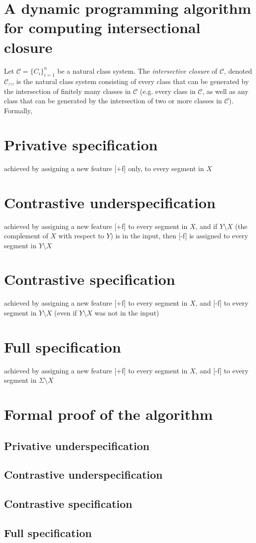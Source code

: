 \documentclass[11pt, oneside]{article}   	%
\begin{document}
\section{A dynamic programming algorithm for computing intersectional closure}

Let $\mathcal C = \{C_i\}_{i=1}^n$ be a natural class system. The \textit{intersective closure} of $\mathcal C$, denoted $\mathcal C_\cap$, is the natural class system consisting of every class that can be generated by the intersection of finitely many classes in $\mathcal C$ (e.g. every class in $\mathcal C$, as well as any class that can be generated by the intersection of two or more classes in $\mathcal C$). Formally, 

\section{Privative specification}
achieved by assigning a new feature [+f] only, to every segment in $X$

\section{Contrastive underspecification}
achieved by assigning a new feature [+f] to every segment in $X$, and if $Y \setminus X$ (the complement of $X$ with respect to $Y$) is in the input, then [-f] is assigned to every segment in $Y \setminus X$

\section{Contrastive specification}
achieved by assigning a new feature [+f] to every segment in $X$, and [-f] to every segment in $Y \setminus X$ (even if $Y \setminus X$ was not in the input)

\section{Full specification}
achieved by assigning a new feature [+f] to every segment in $X$, and [-f] to every segment in $\Sigma \setminus X$

\appendix

\section{Formal proof of the algorithm}

\subsection{Privative underspecification}

\subsection{Contrastive underspecification}

\subsection{Contrastive specification}

\subsection{Full specification}
\end{document}
